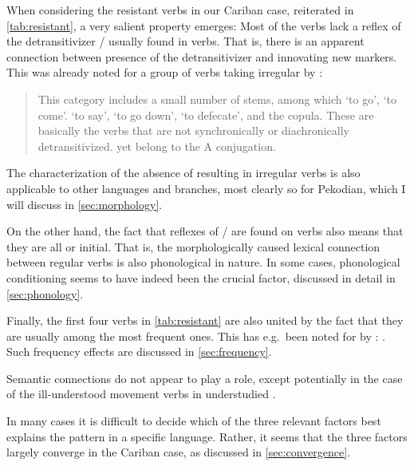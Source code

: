 When considering the resistant verbs in our Cariban case, reiterated in \cref{tab:resistant}, a very salient property emerges:
Most of the verbs lack a reflex of the detransitivizer / usually found in   verbs.
That is, there is an apparent connection between presence of the detransitivizer and innovating new  markers.
This was already noted for a group of \PTar verbs taking irregular  by \textcite[112]{meira1998proto}:
\begin{quotation}
	This category includes a small number of stems, among which ‘to go’, ‘to come’. ‘to say’, ‘to go down’, ‘to defecate', and the copula. These are basically the verbs that are not synchronically or diachronically detransitivized. yet belong to the A conjugation.
\end{quotation}
The characterization of the absence of \detrz resulting in irregular verbs is also applicable to other languages and branches, most clearly so for Pekodian, which I will discuss in \cref{sec:morphology}.

On the other hand, the fact that reflexes of / are found on   verbs also means that they are all  or  initial.
That is, the morphologically caused lexical connection between regular  verbs is also phonological in nature.
In some cases, phonological conditioning seems to have indeed been the crucial factor, discussed in detail in \cref{sec:phonology}.

Finally, the first four verbs in \cref{tab:resistant} are also united by the fact that they are usually among the most frequent ones.
This has e.g.\ been noted for \kalina by \textcite[75]{courtz2008carib}: .
Such frequency effects are discussed in \cref{sec:frequency}.

Semantic connections do not appear to play a role, except potentially in the case of the ill-understood movement verbs in understudied \akuriyo.

In many cases it is difficult to decide which of the three relevant factors best explains the pattern in a specific language.
Rather, it seems that the three factors largely converge in the Cariban case, as discussed in \cref{sec:convergence}.

